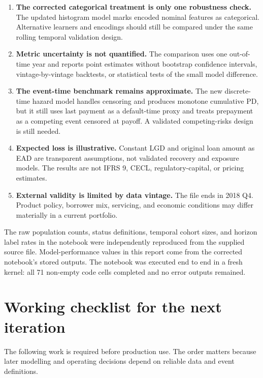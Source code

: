 \documentclass[11pt]{article}
\begin{document}
\begin{enumerate}
  \item \textbf{The corrected categorical treatment is only one robustness
  check.} The updated histogram model marks encoded nominal features as
  categorical. Alternative learners and encodings should still be compared under
  the same rolling temporal validation design.

  \item \textbf{Metric uncertainty is not quantified.} The comparison uses one
  out-of-time year and reports point estimates without bootstrap confidence
  intervals, vintage-by-vintage backtests, or statistical tests of the small model
  difference.

  \item \textbf{The event-time benchmark remains approximate.} The new
  discrete-time hazard model handles censoring and produces monotone cumulative PD,
  but it still uses last payment as a default-time proxy and treats prepayment as a
  competing event censored at payoff. A validated competing-risks design is still
  needed.

  \item \textbf{Expected loss is illustrative.} Constant LGD and original loan
  amount as EAD are transparent assumptions, not validated recovery and exposure
  models. The results are not IFRS 9, CECL, regulatory-capital, or pricing estimates.

  \item \textbf{External validity is limited by data vintage.} The file ends in
  2018 Q4. Product policy, borrower mix, servicing, and economic conditions may
  differ materially in a current portfolio.
\end{enumerate}

The raw population counts, status definitions, temporal cohort sizes, and horizon
label rates in the notebook were independently reproduced from the supplied source
file. Model-performance values in this report come from the corrected notebook's
stored outputs. The notebook was executed end to end in a fresh kernel: all 71
non-empty code cells completed and no error outputs remained.

\section{Working checklist for the next iteration}

The following work is required before production use. The order matters because
later modelling and operating decisions depend on reliable data and event
definitions.
\end{document}

